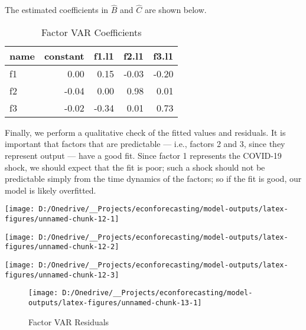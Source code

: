 \documentclass[11pt, letterpaper]{article}\usepackage[]{graphicx}\usepackage[]{color}
\begin{document}
The estimated coefficients in $\widehat{B}$ and $\widehat{C}$ are shown below.
\begin{table}[H]
\centering
\begingroup\footnotesize
\begin{tabular}{lrrrr}
  \hline
name & constant & f1.l1 & f2.l1 & f3.l1 \\ 
  \hline
f1 & 0.00 & 0.15 & -0.03 & -0.20 \\ 
  f2 & -0.04 & 0.00 & 0.98 & 0.01 \\ 
  f3 & -0.02 & -0.34 & 0.01 & 0.73 \\ 
   \hline
\end{tabular}
\endgroup
\caption{Factor VAR Coefficients} 
\end{table}



Finally, we perform a qualitative check of the fitted values and residuals. It is important that factors that are predictable --- i.e., factors 2 and 3, since they represent output --- have a good fit. Since factor 1 represents the COVID-19 shock, we should expect that the fit is poor; such a shock should not be predictable simply from the time dynamics of the factors; so if the fit is good, our model is likely overfitted.


{\centering \texttt{[image: D:/Onedrive/\_\_Projects/econforecasting/model-outputs/latex-figures/unnamed-chunk-12-1]} 

}




{\centering \texttt{[image: D:/Onedrive/\_\_Projects/econforecasting/model-outputs/latex-figures/unnamed-chunk-12-2]} 

}




{\centering \texttt{[image: D:/Onedrive/\_\_Projects/econforecasting/model-outputs/latex-figures/unnamed-chunk-12-3]} 

}





\begin{figure}[H]

{\centering \texttt{[image: D:/Onedrive/\_\_Projects/econforecasting/model-outputs/latex-figures/unnamed-chunk-13-1]} 

}

\caption[Factor VAR Residuals]{Factor VAR Residuals}\label{fig:unnamed-chunk-13}
\end{figure}
\end{document}
